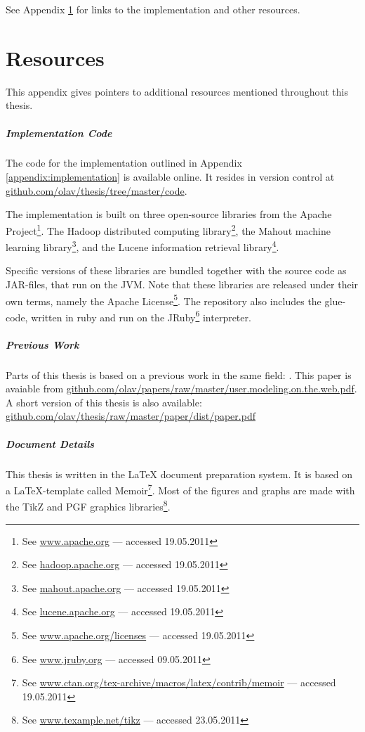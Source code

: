 \vspace{1em}
\noindent
See Appendix \ref{appendix:resources} for links to the implementation
and other resources.


\chapter{Resources}
\label{appendix:resources}

This appendix gives pointers to additional resources mentioned throughout this thesis.

\paragraph{Implementation Code}
The code for the implementation outlined in Appendix \ref{appendix:implementation} is available online.
It resides in version control at 
\url{github.com/olav/thesis/tree/master/code}.

The implementation is built on three open-source libraries from the
Apache Project\footnote{See \url{www.apache.org} --- accessed 19.05.2011}.
The Hadoop distributed computing library\footnote{See \url{hadoop.apache.org} --- accessed 19.05.2011},
the Mahout machine learning library\footnote{See \url{mahout.apache.org} --- accessed 19.05.2011},
and the Lucene information retrieval library\footnote{See \url{lucene.apache.org} --- accessed 19.05.2011}.

Specific versions of these libraries are bundled together with
the source code as JAR-files, that run on the JVM.
Note that these libraries are released under their own terms,
namely the Apache License\footnote{
See \url{www.apache.org/licenses} --- accessed 19.05.2011}.
The repository also includes the glue-code, written in ruby and run on the JRuby\footnote{
See \url{www.jruby.org} --- accessed 09.05.2011} interpreter.

\paragraph{Previous Work}
Parts of this thesis is based on a previous work in the same field:
\cite{Bjorkoy2010d}. This paper is avaiable from
\url{github.com/olav/papers/raw/master/user.modeling.on.the.web.pdf}.
A short version of this thesis is also available:
\url{github.com/olav/thesis/raw/master/paper/dist/paper.pdf}

\paragraph{Document Details}
This thesis is written in the LaTeX document preparation system.
It is based on a LaTeX-template called Memoir\footnote{
See \url{www.ctan.org/tex-archive/macros/latex/contrib/memoir} --- accessed 19.05.2011}.
Most of the figures and graphs are made with the TikZ and PGF graphics libraries\footnote{
See \url{www.texample.net/tikz} --- accessed 23.05.2011}.

